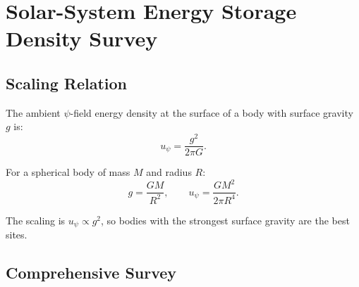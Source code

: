 \documentclass[aps,prd,twocolumn,showpacs,preprintnumbers,superscriptaddress,nofootinbib]{revtex4-2}
\begin{document}
\section{Solar-System Energy Storage Density Survey}\label{sec:solar-system}

\subsection{Scaling Relation}\label{sec:scaling}

The ambient $\psi$-field energy density at the surface of a body with
surface gravity $g$ is:
\begin{equation}\label{eq:u-body}
u_\psi = \frac{g^2}{2\pi G}.
\end{equation}

For a spherical body of mass $M$ and radius $R$:
\begin{equation}
g = \frac{GM}{R^2}, \qquad
u_\psi = \frac{G M^2}{2\pi R^4}.
\end{equation}

The scaling is $u_\psi \propto g^2$, so bodies with the strongest
surface gravity are the best sites.

\subsection{Comprehensive Survey}\label{sec:survey}
\end{document}
